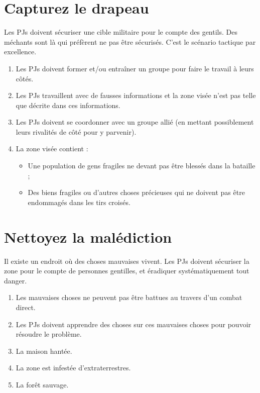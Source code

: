 \begin{multicols}{2}
\section{Capturez le drapeau}
\label{drapeau}


Les PJs doivent sécuriser une cible militaire pour le compte des gentils. Des méchants sont là qui préfèrent ne pas être sécurisés. C'est le scénario tactique par excellence.

\themes
\begin{enumerate}
\item Les PJs doivent former et/ou entraîner un groupe pour faire le travail à leurs côtés.
\item Les PJs travaillent avec de fausses informations et la zone visée n'est pas telle que décrite dans ces informations.
\item Les PJs doivent se coordonner avec un groupe allié (en mettant possiblement leurs rivalités de côté pour y parvenir).
\item La zone visée contient :
\begin{itemize}
\item Une population de gens fragiles ne devant pas être blessés dans la bataille ;
\item Des biens fragiles ou d'autres choses précieuses qui ne doivent pas être endommagés dans les tirs croisés.
\end{itemize}
\end{enumerate}

\section{Nettoyez la malédiction}
\label{malediction}


Il existe un endroit où des choses mauvaises vivent. Les PJs doivent sécuriser la zone pour le compte de personnes gentilles, et éradiquer systématiquement tout danger.

\themes
\begin{enumerate}
\item Les mauvaises choses ne peuvent pas être battues au travers d'un combat direct.
\item Les PJs doivent apprendre des choses sur ces mauvaises choses pour pouvoir résoudre le problème.
\item La maison hantée.
\item La zone est infestée d'extraterrestres.
\item La forêt sauvage.
\end{enumerate}


\end{multicols}
